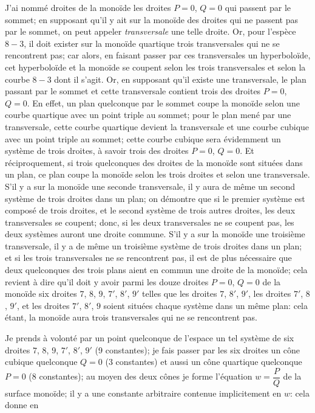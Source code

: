 \documentclass[11pt,a4paper]{article}
\begin{document}
\medskip

J'ai nomm\'{e} droites de la mono\"{i}de les droites $P=0$, $Q=0$ qui passent par le sommet; en supposant qu'il y ait sur la mono\"{i}de des droites qui ne passent pas par le sommet, on peut appeler \textit{transversale} une telle droite. Or, pour l'esp\`{e}ce $8-3$, il doit exister sur la mono\"{i}de quartique trois transversales qui ne se rencontrent pas; car alors, en faisant passer par ces transversales un hyperbolo\"{i}de, cet hyperbolo\"{i}de et la mono\"{i}de se coupent selon les trois transversales et selon la courbe $8-3$ dont il s'agit. Or, en supposant qu'il existe une transversale, le plan passant par le sommet et cette transversale contient trois des droites $P=0$, $Q=0$. En effet, un plan quelconque par le sommet coupe la mono\"{i}de selon une courbe quartique avec un point triple au sommet; pour le plan men\'{e} par une transversale, cette courbe quartique devient la transversale et une courbe cubique avec un point triple au sommet; cette courbe cubique sera \'{e}videmment un syst\`{e}me de trois droites, \`{a} savoir trois des droites $P=0$, $Q=0$. Et r\'{e}ciproquement, si trois quelconques des droites de la mono\"{i}de sont situ\'{e}es dans un plan, ce plan coupe la mono\"{i}de selon les trois droites et selon une transversale. S'il y a sur la mono\"{i}de une seconde transversale, il y aura de m\^{e}me un second syst\`{e}me de trois droites dans un plan; on d\'{e}montre que si le premier syst\`{e}me est compos\'{e} de trois droites, et le second syst\`{e}me de trois autres droites, les deux transversales se coupent; donc, si les deux transversales ne se coupent pas, les deux syst\`{e}mes auront une droite commune. S'il y a sur la mono\"{i}de une troisi\`{e}me transversale, il y a de m\^{e}me un troisi\`{e}me syst\`{e}me de trois droites dans un plan; et si les trois transversales ne se rencontrent pas, il est de plus n\'{e}cessaire que deux quelconques des trois plans aient en commun une droite de la mono\"{i}de; cela revient \`{a} dire qu'il doit y avoir parmi les douze droites $P=0$, $Q=0$ de la mono\"{i}de six droites $7$, $8$, $9$, $7'$, $8'$, $9'$ telles que les droites $7$, $8'$, $9'$, les droites $7'$, $8$, $9'$, et les droites $7'$, $8'$, $9$ soient situ\'{e}es chaque syst\`{e}me dans un m\^{e}me plan: cela \'{e}tant, la mono\"{i}de aura trois transversales qui ne se rencontrent pas.

\medskip

Je prends \`{a} volont\'{e} par un point quelconque de l'espace un tel syst\`{e}me de six droites $7$, $8$, $9$, $7'$, $8'$, $9'$ (9 constantes); je fais passer par les six droites un c\^{o}ne cubique quelconque $Q=0$ (3 constantes) et aussi un c\^{o}ne quartique quelconque $P=0$ (8 constantes); au moyen des deux c\^{o}nes je forme l'\'{e}quation $w=\dfrac{P}{Q}$ de la surface mono\"{i}de; il y a une constante arbitraire contenue implicitement en $w$: cela donne en
\clearpage
\end{document}
